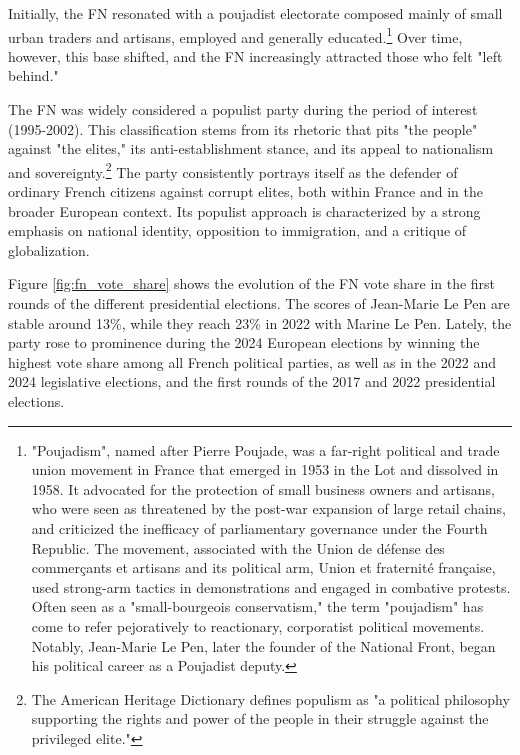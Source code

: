 Initially, the FN resonated with a poujadist electorate composed mainly of small urban traders and artisans, employed and generally educated.\footnote{"Poujadism", named after Pierre Poujade, was a far-right political and trade union movement in France that emerged in 1953 in the Lot and dissolved in 1958. It advocated for the protection of small business owners and artisans, who were seen as threatened by the post-war expansion of large retail chains, and criticized the inefficacy of parliamentary governance under the Fourth Republic. The movement, associated with the Union de défense des commerçants et artisans and its political arm, Union et fraternité française, used strong-arm tactics in demonstrations and engaged in combative protests. Often seen as a "small-bourgeois conservatism," the term "poujadism" has come to refer pejoratively to reactionary, corporatist political movements. Notably, Jean-Marie Le Pen, later the founder of the National Front, began his political career as a Poujadist deputy.} Over time, however, this base shifted, and the FN increasingly attracted those who felt "left behind."

The FN was widely considered a populist party during the period of interest (1995-2002). This classification stems from its rhetoric that pits "the people" against "the elites," its anti-establishment stance, and its appeal to nationalism and sovereignty.\footnote{The American Heritage Dictionary defines populism as "a political philosophy supporting the rights and power of the people in their struggle against the privileged elite."} The party consistently portrays itself as the defender of ordinary French citizens against corrupt elites, both within France and in the broader European context. Its populist approach is characterized by a strong emphasis on national identity, opposition to immigration, and a critique of globalization.



Figure \ref{fig:fn_vote_share} shows the evolution of the FN vote share in the first rounds of the different presidential elections. The scores of Jean-Marie Le Pen are stable around 13\%, while they reach 23\% in 2022 with Marine Le Pen. Lately, the party rose to prominence during the 2024 European elections by winning the highest vote share among all French political parties, as well as in the 2022 and 2024 legislative elections, and the first rounds of the 2017 and 2022 presidential elections.


